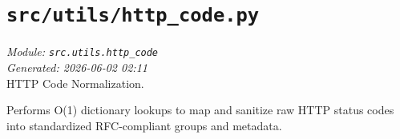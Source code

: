 
\section{\texttt{src/utils/http\_code.py}}
\textit{Module: \texttt{src.utils.http\_code}} \\
\textit{Generated: 2026-06-02 02:11} \\

HTTP Code Normalization.

Performs O(1) dictionary lookups to map and sanitize raw HTTP status
codes into standardized RFC-compliant groups and metadata.
